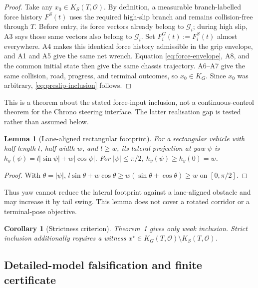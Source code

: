 \documentclass[11pt]{article}
\newtheorem{lemma}{Lemma}
\newtheorem{corollary}{Corollary}
\begin{document}
\begin{proof}
Take any $x_0\in K_S(T,\mathcal O)$. By definition, a measurable branch-labelled force history
$F^S(t)$ uses the required high-slip branch and remains collision-free through $T$. Before entry,
its force vectors already belong to $\mathcal G_i$; during high slip, A3 says those same vectors also
belong to $\mathcal G_i$. Set $F_i^G(t):=F_i^S(t)$ almost everywhere. A4 makes this identical force
history admissible in the grip envelope, and A1 and A5 give the same net wrench. Equation
\eqref{eq:force-envelope}, A8, and the common initial state then give the same chassis trajectory.
A6--A7 give the same collision, road, progress, and terminal outcomes, so $x_0\in K_G$. Since
$x_0$ was arbitrary, \eqref{eq:preslip-inclusion} follows.
\end{proof}

This is a theorem about the stated force-input inclusion, not a continuous-control theorem for the
Chrono steering interface. The latter realisation gap is tested rather than assumed below.

\begin{lemma}[Lane-aligned rectangular footprint]
For a rectangular vehicle with half-length $l$, half-width $w$, and $l\geq w$, its lateral
projection at yaw $\psi$ is
$h_y(\psi)=l|\sin\psi|+w|\cos\psi|$. For $|\psi|\leq\pi/2$,
$h_y(\psi)\geq h_y(0)=w$.
\end{lemma}
\begin{proof}
With $\theta=|\psi|$, $l\sin\theta+w\cos\theta\geq
w(\sin\theta+\cos\theta)\geq w$ on $[0,\pi/2]$.
\end{proof}
Thus yaw cannot reduce the lateral footprint against a lane-aligned obstacle and may increase it by
tail swing. This lemma does not cover a rotated corridor or a terminal-pose objective.

\begin{corollary}[Strictness criterion]
Theorem~1 gives only weak inclusion. Strict inclusion additionally requires a witness
$x^\star\in K_G(T,\mathcal O)\setminus K_S(T,\mathcal O)$.
\end{corollary}

\subsection{Detailed-model falsification and finite certificate}
\end{document}
